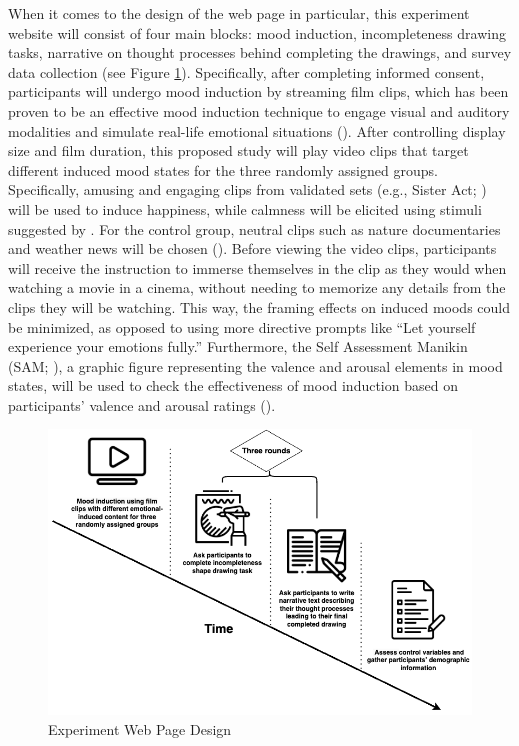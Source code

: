 \documentclass[../MA_Thesis.tex]{subfiles}
\begin{document}
When it comes to the design of the web page in particular, this experiment website will consist of four main blocks: mood induction, incompleteness drawing tasks, narrative on thought processes behind completing the drawings, and survey data collection (see Figure \ref{fig: Experiment Web Page Design}). Specifically, after completing informed consent, participants will undergo mood induction by streaming film clips, which has been proven to be an effective mood induction technique to engage visual and auditory modalities and simulate real-life emotional situations (\cite{siedlecka_experimental_2019}). After controlling display size and film duration, this proposed study will play video clips that target different induced mood states for the three randomly assigned groups. Specifically, amusing and engaging clips from validated sets (e.g., Sister Act; \cite{maryam_fakhrhosseini_affectemotion_2017}) will be used to induce happiness, while calmness will be elicited using stimuli suggested by \textcite{kimura_emotional_2019}. For the control group, neutral clips such as nature documentaries and weather news will be chosen (\cite{siedlecka_experimental_2019}). Before viewing the video clips, participants will receive the instruction to immerse themselves in the clip as they would when watching a movie in a cinema, without needing to memorize any details from the clips they will be watching. This way, the framing effects on induced moods could be minimized, as opposed to using more directive prompts like ``Let yourself experience your emotions fully.'' Furthermore, the Self Assessment Manikin (SAM; \cite{bradley_affect_1999}), a graphic figure representing the valence and arousal elements in mood states, will be used to check the effectiveness of mood induction based on participants' valence and arousal ratings (\cite{kucera_using_2012}).

\begin{figure}
    \centering
    \includegraphics[width=0.7\linewidth, keepaspectratio]{drawio/Experiment Timeline.png}
    \caption{Experiment Web Page Design}
    \label{fig: Experiment Web Page Design}
\end{figure}
\end{document}
